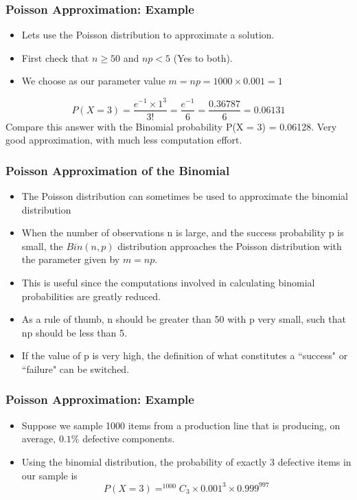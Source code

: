 \documentclass[IntroMain.tex]{subfiles}
\begin{document}
\begin{frame}
	\frametitle{Poisson Approximation: Example}
	\begin{itemize}
		\item Lets use the Poisson distribution to approximate a solution.
		\item First check that $n \geq 50$ and $np < 5$ (Yes to both).
		\item We choose as our parameter value $m = np = 1000 \times 0.001 = 1$
	\end{itemize}
	\[P(X = 3) = \frac{e^{-1} \times 1^3}{3!} = \frac{e^{-1}}{6} = \frac{0.36787}{6} = 0.06131 \]
	Compare this answer with the Binomial probability
	P(X = 3) = 0.06128.
	Very good approximation, with much less computation effort.
\end{frame}
\begin{frame}
	\frametitle{Poisson Approximation of the Binomial}
	
	\begin{itemize}
		\item The Poisson distribution can sometimes be used to approximate the
		binomial distribution
		\item When the number of observations n is large, and the success probability
		p is small, the $Bin(n,p)$ distribution approaches the Poisson distribution
		with the parameter given by $m = np$.
		\item This is useful since the computations involved in calculating binomial
		probabilities are greatly reduced.
		\item As a rule of thumb, n should be greater than 50 with p very small, such
		that np should be less than 5.
		\item If the value of p is very high, the definition of what constitutes a
		``success" or ``failure" can be switched.
	\end{itemize}
\end{frame}

\begin{frame}
	\frametitle{Poisson Approximation: Example}
	
	\begin{itemize}
		\item Suppose we sample 1000 items from a production line that is producing, on
		average, $0.1\%$ defective components.
		\item Using the binomial distribution, the probability of exactly 3 defective items in
		our sample is
		\[P(X = 3) = ^{1000}C_{3} \times 0.001^{3} \times 0.999^{997}\]
	\end{itemize}
\end{frame}
\end{document}
